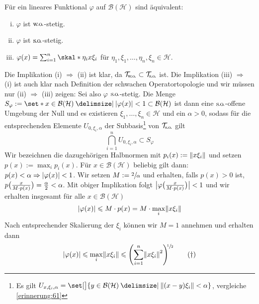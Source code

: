 \begin{satz}[label=satz:619,{name=[für Funktionale ist schwach stetig äquivalent zu stark stetig]}]
	Für ein lineares Funktional $\varphi$ auf $\mathcal{B}(\mathcal{H})$ sind äquivalent:
	\begin{enumerate}[(i),itemsep=0pt]
		\item $\varphi$ ist $\wo$-stetig.
		\item $\varphi$ ist $\so$-stetig.
		\item $\varphi(x)=\sum_{i=1}^{n} \skal*{\eta_i}{x \xi_i} $ für $\eta_1,\xi_1, \ldots , \eta_n, \xi_n \in \mathcal{H}$.
	\end{enumerate}
\end{satz}
\begin{beweis}
	Die Implikation (i) $\Rightarrow$ (ii) ist klar, da $\TWeakOp \subset \Tso$ ist.
	Die Implikation (iii) $\Rightarrow$ (i) ist auch klar nach Definition der schwachen Operatortopologie und wir müssen nur (ii) $\Rightarrow$ (iii) zeigen:
	Sei also $\varphi$ $\so$-stetig. Die Menge $S_\varphi := \set*{x \in \mathcal{B}(\mathcal{H}) \given \abs*{\varphi(x)}<1} \subset \mathcal{B}(\mathcal{H})$ ist dann eine $\so$-offene Umgebung der Null und es existieren $\xi_1, \ldots ,\xi_n \in \mathcal{H}$ und ein $\alpha>0$, sodass für die entsprechenden Elemente $U_{0,\xi_i,\alpha}$ der Subbasis\footnote{Es gilt $U_{x,\xi_i,\alpha}=\set[\big]{y \in \mathcal{B}(\mathcal{H}) \given \norm*{(x-y)\xi_i}< \alpha}$, vergleiche \autoref{erinnerung:61}} von $\Tso$ gilt
	\[
		\bigcap_{i=1}^n U_{0,\xi_i,\alpha}  \subset S_\varphi
	\]
	Wir bezeichnen die dazugehörigen Halbnormen mit $p_{i}(x) := \norm*{x \xi_i}$ und setzen $p(x) := \max_{i} p_i(x)$.
	Für $x \in \mathcal{B}(\mathcal{H})$ beliebig gilt dann: $p(x)<\alpha \Rightarrow \abs*{\varphi(x)}<1$.
	Wir setzen $M := \sfrac{2}{\alpha}$ und erhalten, falls $p(x)>0$ ist,
	\(
		p \enbrace[\big]{\frac{x}{M \cdot p(x)}} = \frac{\alpha}{2} < \alpha 
	\).
	Mit obiger Implikation folgt $\abs[\big]{\varphi \enbrace[\big]{\frac{x}{M \cdot p(x)}}} < 1$ und wir erhalten insgesamt für alle $x \in \mathcal{B}(\mathcal{H})$
	\begin{equation}
		\abs*{\varphi(x)} \le M \cdot p(x) = M \cdot \max_i \norm*{x \xi_i}
	\end{equation}
	Nach entsprechender Skalierung der $\xi_i$ können wir $M=1$ annehmen und erhalten dann
	\begin{equation}
		\abs*{\varphi(x)} \le  \max_i \norm*{x \xi_i} \le \enbrace*{\sum_{i=1}^{n} \norm*{x \xi_i}^2}^{\mkern-5mu\raisemath{-2.2pt}{\sfrac{1}{2}}} \label{eq:619}\tag{\dag}

\end{equation}
\end{beweis}
